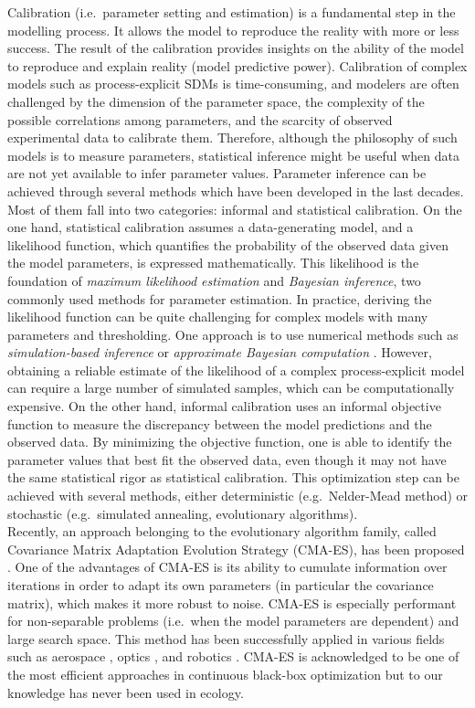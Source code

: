 Calibration (i.e.~parameter setting and estimation) is a fundamental
step in the modelling process. It allows the model to reproduce the
reality with more or less success. The result of the calibration
provides insights on the ability of the model to reproduce and explain
reality (model predictive power). Calibration of complex models such as
process-explicit SDMs is time-consuming, and modelers are often challenged
by the dimension of the parameter space, the complexity of the possible
correlations among parameters, and the scarcity of observed experimental
data to calibrate them. Therefore, although the philosophy of such
models is to measure parameters, statistical inference might be useful
when data are not yet available to infer parameter values. Parameter
inference can be achieved through several methods which have been
developed in the last decades. Most of them fall into two categories:
informal and statistical calibration. On the one hand, statistical
calibration assumes a data-generating model, and a likelihood function,
which quantifies the probability of the observed data given the model
parameters, is expressed mathematically. This likelihood is the
foundation of \emph{maximum likelihood estimation} and
\emph{Bayesian inference}, two commonly used methods for parameter
estimation. In practice, deriving the likelihood function can be quite
challenging for complex models with many parameters and thresholding.
One approach is to use numerical methods such as
\emph{simulation-based inference} or \emph{approximate Bayesian computation} \citep[e.g.][]{Hartig2014}. However, obtaining a reliable estimate of the
likelihood of a complex process-explicit model can require a large number
of simulated samples, which can be computationally expensive. On the
other hand, informal calibration uses an informal objective function to
measure the discrepancy between the model predictions and the observed
data. By minimizing the objective function, one is able to identify the
parameter values that best fit the observed data, even though it may not
have the same statistical rigor as statistical calibration. This
optimization step can be achieved with several methods, either
deterministic (e.g.~Nelder-Mead method) or stochastic (e.g.~simulated
annealing, evolutionary algorithms).\\
Recently, an approach belonging to the evolutionary algorithm family,
called Covariance Matrix Adaptation Evolution Strategy (CMA-ES), has
been proposed \citep{Hansen2001}. One of the advantages of CMA-ES is its ability to cumulate
information over iterations in order to adapt its own parameters (in
particular the covariance matrix), which makes it more robust to noise.
CMA-ES is especially performant for non-separable problems (i.e.~when
the model parameters are dependent) and large search space. This method
has been successfully applied in various fields such as aerospace \citep[e.g.][]{Collange2010},
optics \citep[e.g.][]{Gagne2008}, and robotics \citep[e.g.][]{Hill2020}. CMA-ES is acknowledged to be one of the most
efficient approaches in continuous black-box optimization
\citep{Hansen2010} but to
our knowledge has never been used in ecology.

